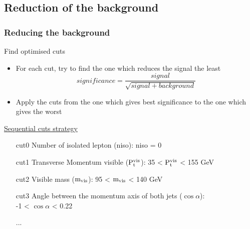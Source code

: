 \documentclass{beamer}
\begin{document}
  \subsection{Reduction of the background}
\begin{frame}
  \frametitle{Reducing the background}
    
  \vspace{-0.25cm}
  \begin{block}{Find optimised cuts}
      \begin{itemize}
          \item For each cut, try to find the one which reduces the signal the least
              \[significance = \frac{signal}{\sqrt{signal + background}}\]
          \item Apply the cuts from the one which gives best significance to the one which gives the worst
      \end{itemize}
  \end{block}

  \vspace{-0.2cm}
  \begin{exampleblock}{\hyperlink{cuts}{Sequential cuts strategy}}
      \begin{enumerate}
          \item [cut0] Number of isolated lepton (niso): niso = 0 %
          \item [cut1] Transverse Momentum visible ($\rm{P_{t}^{vis}}$): 35 < $\rm{P_{t}^{vis}}$ < 155 GeV
          \item [cut2] Visible mass ($\rm{m_{vis}}$): 95 < $\rm{m_{vis}}$ < 140 GeV
          \item [cut3] Angle between the momentum axis of both jets ($\cos{\alpha}$):\\ -1 < $\cos{\alpha}$ < 0.22
          \vspace{-0.1cm}
          \item [...]
      \end{enumerate}
  \end{exampleblock}

\end{frame}
\end{document}
